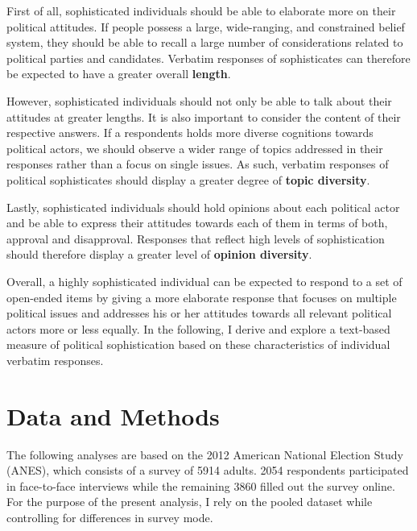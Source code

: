 \documentclass[12pt]{article}
\begin{document}
First of all, sophisticated individuals should be able to elaborate more on their political attitudes. If people possess a large, wide-ranging, and constrained belief system, they should be able to recall a large number of considerations related to political parties and candidates. Verbatim responses of sophisticates can therefore be expected to have a greater overall \textbf{length}. 

However, sophisticated individuals should not only be able to talk about their attitudes at greater lengths. It is also important to consider the content of their respective answers. If a respondents holds more diverse cognitions towards political actors, we should observe a wider range of topics addressed in their responses rather than a focus on single issues. As such, verbatim responses of political sophisticates should display a greater degree of \textbf{topic diversity}.

Lastly, sophisticated individuals should hold opinions about each political actor and be able to express their attitudes towards each of them in terms of both, approval and disapproval. Responses that reflect high levels of sophistication should therefore display a greater level of \textbf{opinion diversity}.

Overall, a highly sophisticated individual can be expected to respond to a set of open-ended items by giving a more elaborate response that focuses on multiple political issues and addresses his or her attitudes towards all relevant political actors more or less equally. In the following, I derive and explore a text-based measure of political sophistication based on these characteristics of individual verbatim responses.


\section*{Data and Methods}


The following analyses are based on the 2012 American National Election Study (ANES), which consists of a survey of 5914 adults. 2054 respondents participated in face-to-face interviews while the remaining 3860 filled out the survey online. For the purpose of the present analysis, I rely on the pooled dataset while controlling for differences in survey mode. 
\end{document}
